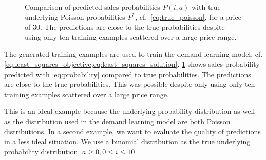 \begin{figure}[t]
	\caption[Comparison of Predicted Probabilites with Underlying Poisson Probabilities]{Comparison of predicted sales probabilities $P(i,a)$ with true underlying Poisson probabilities $P^*$, cf.~\cref{eq:true_poisson}, for a price of 30. The predictions are close to the true probabilities despite using only ten training examples scattered over a large price range.}
	\label{fig:probs_poisson}
\end{figure}

The generated training examples are used to train the demand learning model, cf. \cref{eq:least_squares_objective,eq:least_squares_solution}.
\cref{fig:probs_poisson} shows sales probability predicted with \cref{eq:probability} compared to true probabilities.
The predictions are close to the true probabilities.
This was possible despite only using only ten training examples scattered over a large price range.

This is an ideal example because the underlying probability distribution as well as the distribution used in the demand learning model are both Poisson distributions.
In a second example, we want to evaluate the quality of predictions in a less ideal situation.
We use a binomial distribution as the true underlying probability distribution, $a \geq 0, 0 \leq i \leq 10$

